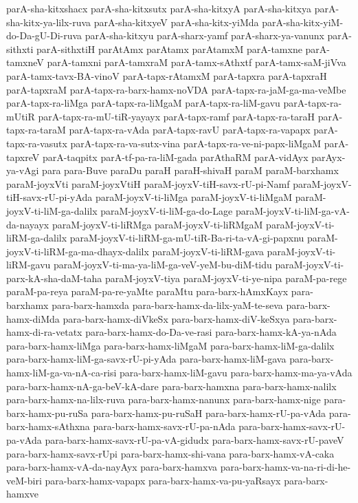 {parA-sha-kitxshacx
parA-sha-kitxsutx
parA-sha-kitxyA
parA-sha-kitxya
parA-sha-kitx-ya-lilx-ruva
parA-sha-kitxyeV
parA-sha-kitx-yiMda
parA-sha-kitx-yiM-do-Da-gU-Di-ruva
parA-sha-kitxyu
parA-sharx-yamf
parA-sharx-ya-vanunx
parA-sithxti
parA-sithxtiH
parAtAmx
parAtamx
parAtamxM
parA-tamxne
parA-tamxneV
parA-tamxni
parA-tamxraM
parA-tamx-sAthxtf
parA-tamx-saM-jiVva
parA-tamx-tavx-BA-vinoV
parA-tapx-rAtamxM
parA-tapxra
parA-tapxraH
parA-tapxraM
parA-tapx-ra-barx-hamx-noVDA
parA-tapx-ra-jaM-ga-ma-veMbe
parA-tapx-ra-liMga
parA-tapx-ra-liMgaM
parA-tapx-ra-liM-gavu
parA-tapx-ra-mUtiR
parA-tapx-ra-mU-tiR-yayayx
parA-tapx-ramf
parA-tapx-ra-taraH
parA-tapx-ra-taraM
parA-tapx-ra-vAda
parA-tapx-ravU
parA-tapx-ra-vapapx
parA-tapx-ra-vasutx
parA-tapx-ra-va-sutx-vina
parA-tapx-ra-ve-ni-papx-liMgaM
parA-tapxreV
parA-taqpitx
parA-tf-pa-ra-liM-gada
parAthaRM
parA-vidAyx
parAyx-ya-vAgi
para
para-Buve
paraDu
paraH
paraH-shivaH
paraM
paraM-barxhamx
paraM-joyxVti
paraM-joyxVtiH
paraM-joyxV-tiH-savx-rU-pi-Namf
paraM-joyxV-tiH-savx-rU-pi-yAda
paraM-joyxV-ti-liMga
paraM-joyxV-ti-liMgaM
paraM-joyxV-ti-liM-ga-dalilx
paraM-joyxV-ti-liM-ga-do-Lage
paraM-joyxV-ti-liM-ga-vA-da-nayayx
paraM-joyxV-ti-liRMga
paraM-joyxV-ti-liRMgaM
paraM-joyxV-ti-liRM-ga-dalilx
paraM-joyxV-ti-liRM-ga-mU-tiR-Ba-ri-ta-vA-gi-papxnu
paraM-joyxV-ti-liRM-ga-ma-dhayx-dalilx
paraM-joyxV-ti-liRM-gava
paraM-joyxV-ti-liRM-gavu
paraM-joyxV-ti-ma-ya-liM-ga-veV-yeM-bu-diM-tidu
paraM-joyxV-ti-parx-kA-sha-daM-taha
paraM-joyxV-tiya
paraM-joyxV-ti-ye-nipa
paraM-pa-rege
paraM-pa-reya
paraM-pa-re-yaMte
paraMtu
para-barx-hAmxKayx
para-barxhamx
para-barx-hamxda
para-barx-hamx-da-lilx-yaM-te-seva
para-barx-hamx-diMda
para-barx-hamx-diVkeSx
para-barx-hamx-diV-keSxya
para-barx-hamx-di-ra-vetatx
para-barx-hamx-do-Da-ve-rasi
para-barx-hamx-kA-ya-nAda
para-barx-hamx-liMga
para-barx-hamx-liMgaM
para-barx-hamx-liM-ga-dalilx
para-barx-hamx-liM-ga-savx-rU-pi-yAda
para-barx-hamx-liM-gava
para-barx-hamx-liM-ga-va-nA-ca-risi
para-barx-hamx-liM-gavu
para-barx-hamx-ma-ya-vAda
para-barx-hamx-nA-ga-beV-kA-dare
para-barx-hamxna
para-barx-hamx-nalilx
para-barx-hamx-na-lilx-ruva
para-barx-hamx-nanunx
para-barx-hamx-nige
para-barx-hamx-pu-ruSa
para-barx-hamx-pu-ruSaH
para-barx-hamx-rU-pa-vAda
para-barx-hamx-sAthxna
para-barx-hamx-savx-rU-pa-nAda
para-barx-hamx-savx-rU-pa-vAda
para-barx-hamx-savx-rU-pa-vA-gidudx
para-barx-hamx-savx-rU-paveV
para-barx-hamx-savx-rUpi
para-barx-hamx-shi-vana
para-barx-hamx-vA-caka
para-barx-hamx-vA-da-nayAyx
para-barx-hamxva
para-barx-hamx-va-na-ri-di-he-veM-biri
para-barx-hamx-vapapx
para-barx-hamx-va-pu-yaRsayx
para-barx-hamxve
}
